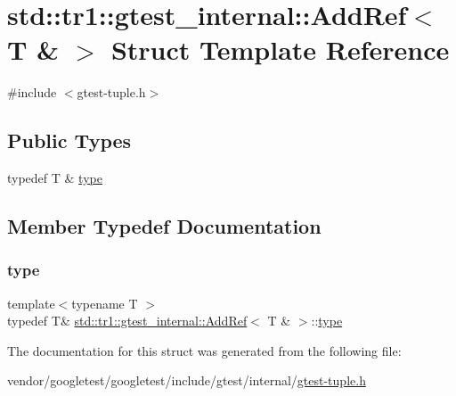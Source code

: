 \hypertarget{structstd_1_1tr1_1_1gtest__internal_1_1_add_ref_3_01_t_01_6_01_4}{}\section{std\+:\+:tr1\+:\+:gtest\+\_\+internal\+:\+:Add\+Ref$<$ T \& $>$ Struct Template Reference}
\label{structstd_1_1tr1_1_1gtest__internal_1_1_add_ref_3_01_t_01_6_01_4}


{\ttfamily \#include $<$gtest-\/tuple.\+h$>$}

\subsection*{Public Types}
\begin{DoxyCompactItemize}
\item 
typedef T \& \hyperlink{structstd_1_1tr1_1_1gtest__internal_1_1_add_ref_3_01_t_01_6_01_4_a9cb3b0992c2a9e7df42d01fb64c2dc88}{type}
\end{DoxyCompactItemize}


\subsection{Member Typedef Documentation}
\mbox{\label{structstd_1_1tr1_1_1gtest__internal_1_1_add_ref_3_01_t_01_6_01_4_a9cb3b0992c2a9e7df42d01fb64c2dc88}} 
\subsubsection{\texorpdfstring{type}{type}}
{\footnotesize\ttfamily template$<$typename T $>$ \\
typedef T\& \hyperlink{structstd_1_1tr1_1_1gtest__internal_1_1_add_ref}{std\+::tr1\+::gtest\+\_\+internal\+::\+Add\+Ref}$<$ T \& $>$\+::\hyperlink{structstd_1_1tr1_1_1gtest__internal_1_1_add_ref_3_01_t_01_6_01_4_a9cb3b0992c2a9e7df42d01fb64c2dc88}{type}}



The documentation for this struct was generated from the following file\+:\begin{DoxyCompactItemize}
\item 
vendor/googletest/googletest/include/gtest/internal/\hyperlink{gtest-tuple_8h}{gtest-\/tuple.\+h}\end{DoxyCompactItemize}
